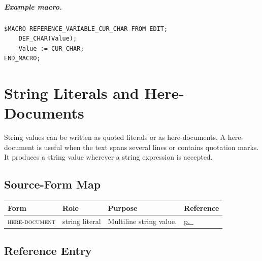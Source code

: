 \documentclass[a4paper,10pt,twoside,openany]{book}
\newcommand{\primitiveoverview}[4]{{\scriptsize\textsc{#1}} & #3 & #4 & \hyperref[prim:#2]{p.~\pageref*{prim:#2}} \\}
\begin{document}
\paragraph{Example macro.}
\begin{verbatim}
$MACRO REFERENCE_VARIABLE_CUR_CHAR FROM EDIT;
    DEF_CHAR(Value);
    Value := CUR_CHAR;
END_MACRO;
\end{verbatim}


\chapter{String Literals and Here-Documents}

String values can be written as quoted literals or as here-documents. A
here-document is useful when the text spans several lines or contains quotation
marks. It produces a string value wherever a string expression is accepted.

\section{Source-Form Map}
\begin{longtable}{@{}L{0.38\textwidth}L{0.14\textwidth}L{0.27\textwidth}L{0.10\textwidth}@{}}
\toprule
Form & Role & Purpose & Reference \\
\midrule
\endhead
\primitiveoverview{here-document}{form-here-document}{string literal}{Multiline string value.}
\bottomrule
\end{longtable}

\section{Reference Entry}
\end{document}
